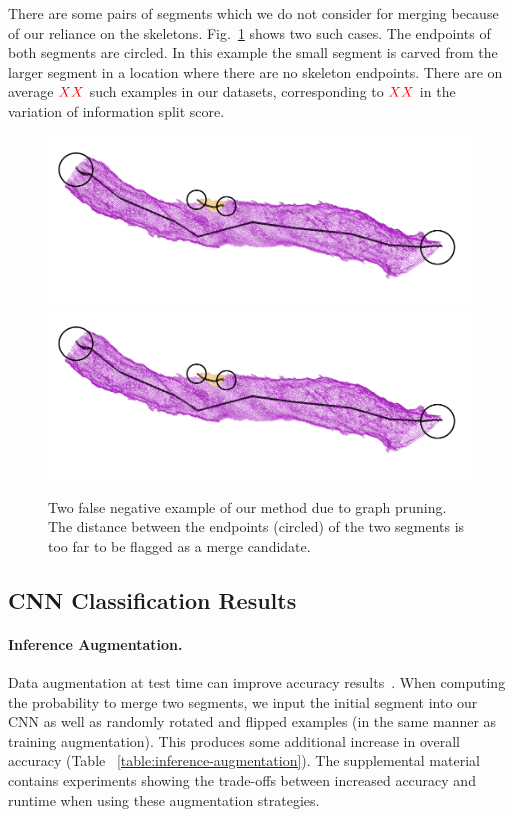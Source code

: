 There are some pairs of segments which we do not consider for merging because of our reliance on the skeletons.
Fig.~\ref{fig:skeleton-results} shows two such cases. 
The endpoints of both segments are circled.
In this example the small segment is carved from the larger segment in a location where there are no skeleton endpoints. 
There are on average $\textcolor{red}{XX}$ such examples in our datasets, corresponding to $\textcolor{red}{XX}$ in the variation of information split score. 

\begin{figure}[t!]
	\centering
	\includegraphics[width=0.45\linewidth]{./figures/merge_candidate1.png}		\includegraphics[width=0.45\linewidth]{./figures/merge_candidate1.png}
	\caption{Two false negative example of our method due to graph pruning. The distance between the endpoints (circled) of the two segments is too far to be flagged as a merge candidate. }
	\label{fig:skeleton-results}
\end{figure}

\subsection{CNN Classification Results}

\paragraph{Inference Augmentation.}

Data augmentation at test time can improve accuracy results~\cite{zeng2017deepem3d}.
When computing the probability to merge two segments, we input the initial segment into our CNN as well as  randomly rotated and flipped examples (in the same manner as training augmentation).
This produces some additional increase in overall accuracy (Table ~\ref{table:inference-augmentation}). 
The supplemental material contains experiments showing the trade-offs between increased accuracy and runtime when using these augmentation strategies.

